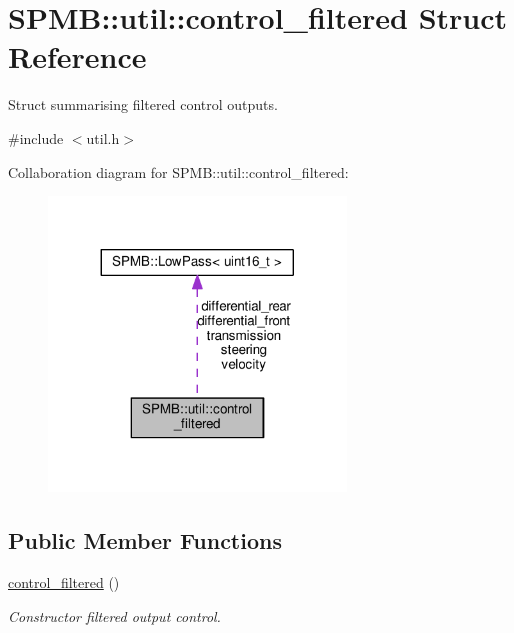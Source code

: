 \hypertarget{structSPMB_1_1util_1_1control__filtered}{}\section{S\+P\+MB\+:\+:util\+:\+:control\+\_\+filtered Struct Reference}
\label{structSPMB_1_1util_1_1control__filtered}


Struct summarising filtered control outputs.  




{\ttfamily \#include $<$util.\+h$>$}



Collaboration diagram for S\+P\+MB\+:\+:util\+:\+:control\+\_\+filtered\+:\nopagebreak
\begin{figure}[H]
\begin{center}
\leavevmode
\includegraphics[width=224pt]{structSPMB_1_1util_1_1control__filtered__coll__graph}
\end{center}
\end{figure}
\subsection*{Public Member Functions}
\begin{DoxyCompactItemize}
\item 
\hyperlink{structSPMB_1_1util_1_1control__filtered_ac0a0f2c04f3085844de25e804259d3da}{control\+\_\+filtered} ()\hypertarget{structSPMB_1_1util_1_1control__filtered_ac0a0f2c04f3085844de25e804259d3da}{}\label{structSPMB_1_1util_1_1control__filtered_ac0a0f2c04f3085844de25e804259d3da}

\begin{DoxyCompactList}\small\item\em Constructor filtered output control. \end{DoxyCompactList}\end{DoxyCompactItemize}
